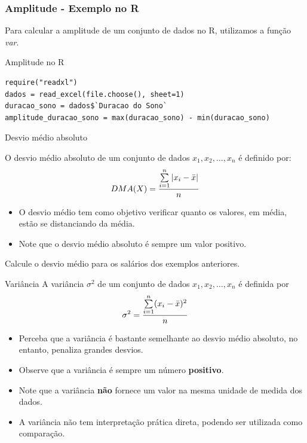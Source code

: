 \begin{frame}[fragile]
\frametitle{Amplitude - Exemplo no R}   
Para calcular a amplitude de um conjunto de dados no R, utilizamos a função \textit{var}.
\begin{block}{Amplitude no R}
\begin{verbatim}
require("readxl")
dados = read_excel(file.choose(), sheet=1) 
duracao_sono = dados$`Duracao do Sono`
amplitude_duracao_sono = max(duracao_sono) - min(duracao_sono)
\end{verbatim}
\end{block}
\end{frame}

\begin{frame}{Desvio médio absoluto}

 O desvio médio absoluto de um conjunto de dados $x_1, x_2, \dots, x_n$ é definido por:
$$DMA(X) = \dfrac{\sum\limits_{i=1}^n |x_i - \Bar{x}|}{n}$$

\pause 
\begin{itemize}
    \item O desvio médio tem como objetivo verificar quanto os valores, em média, estão se distanciando da média.
    \pause
    \item Note que o desvio médio absoluto é sempre um valor positivo. 
\end{itemize}
\pause
\begin{exemplo}
    Calcule o desvio médio para os salários dos exemplos anteriores. 
\end{exemplo}    

\end{frame}

\begin{frame}{Variância}
    A variância $\sigma^2$ de um conjunto de dados $x_1, x_2, \dots, x_n$ é definida por 
    $$\sigma^2 = \dfrac{\sum\limits_{i=1}^n (x_i - \Bar{x})^2}{n}$$
\pause
\begin{itemize}
    \item Perceba que a variância é bastante semelhante ao desvio médio absoluto, no entanto, penaliza grandes desvios. 
    \pause
    \item Observe que a variância é sempre um número \textbf{positivo}.
    \pause
    \item Note que a variância \textbf{não} fornece um valor na mesma unidade de medida dos dados. 
    \pause
    \item A variância não tem interpretação prática direta, podendo ser utilizada como comparação. 
\end{itemize}
\end{frame}

